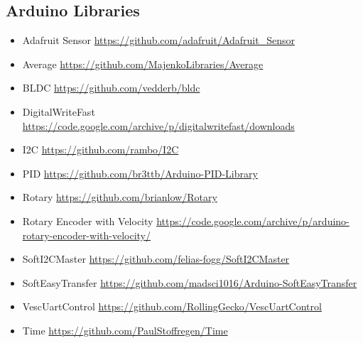 \subsection{Arduino Libraries}
\begin{itemize}
	\begin{itemize} \itemsep -10pt
	\item Adafruit Sensor \url{https://github.com/adafruit/Adafruit_Sensor}
	\item Average \url{https://github.com/MajenkoLibraries/Average}
	\item BLDC \url{https://github.com/vedderb/bldc}
	\item DigitalWriteFast \url{https://code.google.com/archive/p/digitalwritefast/downloads}
	\item I2C \url{https://github.com/rambo/I2C}
	\item PID \url{https://github.com/br3ttb/Arduino-PID-Library}
	\item Rotary \url{https://github.com/brianlow/Rotary}
	\item Rotary Encoder with Velocity \url{https://code.google.com/archive/p/arduino-rotary-encoder-with-velocity/}
	\item SoftI2CMaster \url{https://github.com/felias-fogg/SoftI2CMaster}
	\item SoftEasyTransfer \url{https://github.com/madsci1016/Arduino-SoftEasyTransfer}
	\item VescUartControl \url{https://github.com/RollingGecko/VescUartControl}
	\item Time \url{https://github.com/PaulStoffregen/Time}
	\end{itemize}
\end{itemize}

